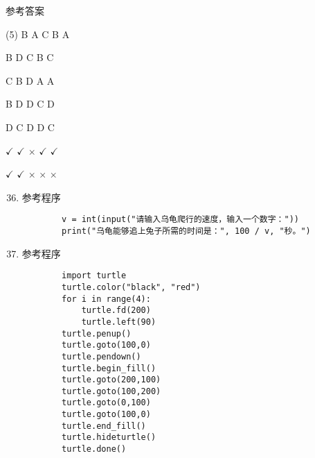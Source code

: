 \documentclass[11pt]{ctexart}
\begin{document}
\begin{center}
    \Huge \heiti 参考答案
\end{center}

    \begin{tasks}[label=\arabic*.](5)
        \task B
        \task A
        \task C
        \task B
        \task A

        \task B
        \task D
        \task C
        \task B
        \task C

        \task C
        \task B
        \task D
        \task A
        \task A

        \task B
        \task D
        \task D
        \task C
        \task D

        \task D
        \task C
        \task D
        \task D
        \task C

        \task $\checkmark$
        \task $\checkmark$
        \task $\times$
        \task $\checkmark$
        \task $\checkmark$

        \task $\checkmark$
        \task $\checkmark$
        \task $\times$
        \task $\times$
        \task $\times$
    \end{tasks}

\begin{enumerate}
    \setcounter{enumi}{35}
    \item 参考程序
    \begin{lstlisting}
        v = int(input("请输入乌龟爬行的速度，输入一个数字："))
        print("乌龟能够追上兔子所需的时间是：", 100 / v, "秒。")
    \end{lstlisting}

    \item 参考程序
    \begin{lstlisting}
        import turtle
        turtle.color("black", "red")
        for i in range(4):
            turtle.fd(200)
            turtle.left(90)
        turtle.penup()
        turtle.goto(100,0)
        turtle.pendown()
        turtle.begin_fill()
        turtle.goto(200,100)
        turtle.goto(100,200)
        turtle.goto(0,100)
        turtle.goto(100,0)
        turtle.end_fill()
        turtle.hideturtle()
        turtle.done()
    \end{lstlisting}
\end{enumerate}
\end{document}
